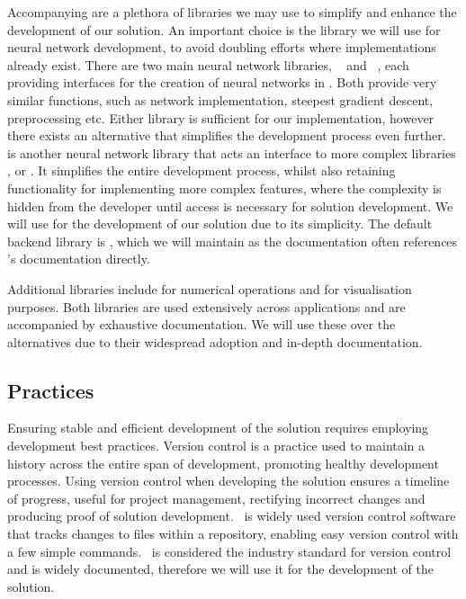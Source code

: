 Accompanying  are a plethora of libraries we may use to simplify and enhance the development of our solution. An important choice is the library we will use for neural network development, to avoid doubling efforts where implementations already exist. There are two main neural network libraries, ~\cite{tensorflow} and ~\cite{pytorch}, each providing interfaces for the creation of neural networks in . Both provide very similar functions, such as network implementation, steepest gradient descent, preprocessing etc. Either library is sufficient for our implementation, however there exists an alternative that simplifies the development process even further.\ ~\cite{keras} is another neural network library that acts an interface to more complex libraries ,  or . It simplifies the entire development process, whilst also retaining functionality for implementing more complex features, where the complexity is hidden from the developer until access is necessary for solution development. We will use  for the development of our solution due to its simplicity. The default backend library is , which we will maintain as the  documentation often references 's documentation directly.

Additional  libraries include  for numerical operations and  for visualisation purposes. Both libraries are used extensively across  applications and are accompanied by exhaustive documentation. We will use these over the alternatives due to their widespread adoption and in-depth documentation.

\subsection{Practices}
Ensuring stable and efficient development of the solution requires employing development best practices. Version control is a practice used to maintain a history across the entire span of development, promoting healthy development processes. Using version control when developing the solution ensures a timeline of progress, useful for project management, rectifying incorrect changes and producing proof of solution development.\  is widely used version control software that tracks changes to files within a repository, enabling easy version control with a few simple commands.\  is considered the industry standard for version control and is widely documented, therefore we will use it for the development of the solution.

